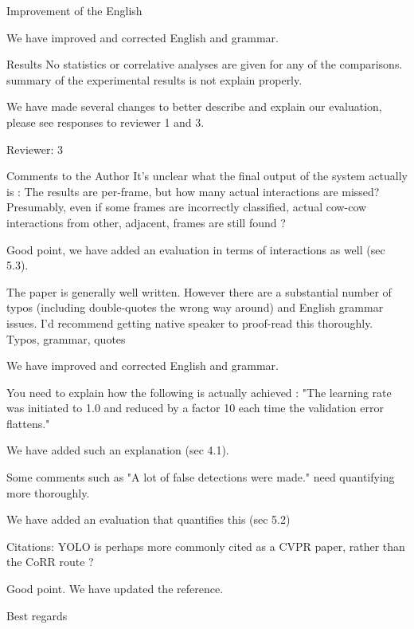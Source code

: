 \documentclass[10pt,a4paper]{letter}
\begin{document}
\begin{letter}{}
\begin{siderules}
Improvement of the English
\end{siderules}

We have improved and corrected English and grammar.

\begin{siderules}
Results No statistics or correlative analyses are given for any of the comparisons.
summary of the experimental results is not explain properly.
\end{siderules}

We have made several changes to better describe and explain our evaluation, please see responses to reviewer 1 and 3.

\begin{siderules}
Reviewer: 3

Comments to the Author
It's unclear what the final output of the system actually is : The results are per-frame, but how many actual interactions are missed? 
Presumably, even if some frames are incorrectly classified, actual cow-cow interactions from other, adjacent, frames are still found ?
\end{siderules}

Good point, we have added an evaluation in terms of interactions as well (sec 5.3).

\begin{siderules}
The paper is generally well written. However there are a substantial number of typos (including double-quotes the wrong way around) and English grammar issues. I'd recommend getting
native speaker to proof-read this thoroughly. Typos, grammar, quotes
\end{siderules}

We have improved and corrected English and grammar.

\begin{siderules}
You need to explain how the following is actually achieved : "The learning rate was initiated to 1.0 and reduced by a factor 10 each time the validation 
error flattens."
\end{siderules}

We have added such an explanation (sec 4.1).

\begin{siderules}
Some comments such as "A lot of false detections were made." need quantifying more thoroughly.
\end{siderules}

We have added an evaluation that quantifies this (sec 5.2)

\begin{siderules}
Citations: YOLO is perhaps more commonly cited as a CVPR paper, rather than the CoRR route ?
\end{siderules}

Good point. We have updated the reference.


 
\closing{Best regards} 
\end{letter} 
\end{document}
